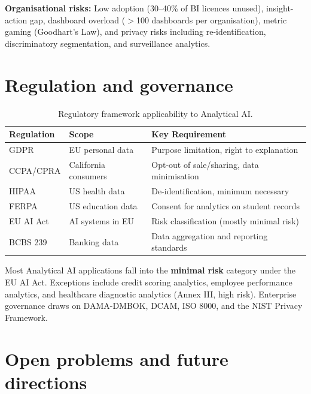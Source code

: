 \documentclass[preprint,12pt,authoryear]{elsarticle}
\theoremstyle{definition}
\begin{document}
\textbf{Organisational risks:} Low adoption (30--40\% of BI licences unused), insight-action gap, dashboard overload ($>$100 dashboards per organisation), metric gaming (Goodhart's Law), and privacy risks including re-identification, discriminatory segmentation, and surveillance analytics.

\section{Regulation and governance}\label{sec:governance}

\begin{table}[ht]
\centering
\caption{Regulatory framework applicability to Analytical AI.}
\label{tab:regulation}
\begin{tabular}{lll}
\toprule
\textbf{Regulation} & \textbf{Scope} & \textbf{Key Requirement} \\
\midrule
GDPR             & EU personal data       & Purpose limitation, right to explanation \\
CCPA/CPRA        & California consumers   & Opt-out of sale/sharing, data minimisation \\
HIPAA            & US health data         & De-identification, minimum necessary \\
FERPA            & US education data      & Consent for analytics on student records \\
EU AI Act        & AI systems in EU       & Risk classification (mostly minimal risk) \\
BCBS 239         & Banking data           & Data aggregation and reporting standards \\
\bottomrule
\end{tabular}
\end{table}

Most Analytical AI applications fall into the \textbf{minimal risk} category under the EU AI Act. Exceptions include credit scoring analytics, employee performance analytics, and healthcare diagnostic analytics (Annex III, high risk). Enterprise governance draws on DAMA-DMBOK, DCAM, ISO 8000, and the NIST Privacy Framework.

\section{Open problems and future directions}\label{sec:future}
\end{document}
